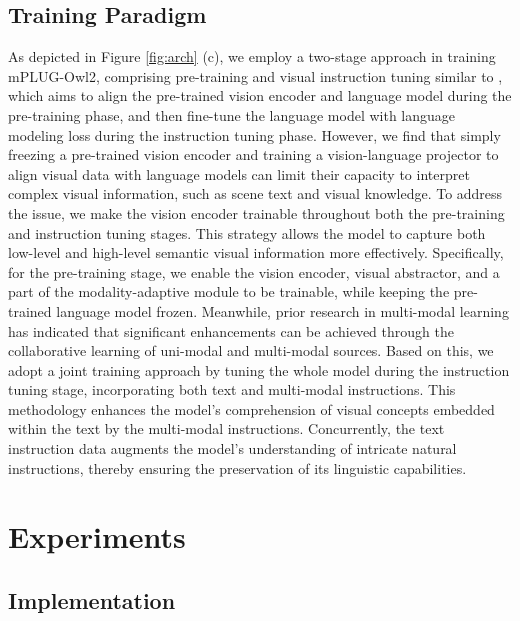 \documentclass[10pt,twocolumn,letterpaper]{article}
\newcommand{\modelname}{mPLUG-Owl2\xspace}
\begin{document}
%
 
\subsection{Training Paradigm}\label{sec:training}
As depicted in Figure \ref{fig:arch} (c), we employ a two-stage approach in training \modelname, comprising pre-training and visual instruction tuning similar to \cite{Liu2023Llava, ye2023mplugowl}, which aims to align the pre-trained vision encoder and language model during the pre-training phase, and then fine-tune the language model with language modeling loss during the instruction tuning phase. However, we find that simply freezing a pre-trained vision encoder and training a vision-language projector to align visual data with language models can limit their capacity to interpret complex visual information, such as scene text and visual knowledge. To address the issue, we make the vision encoder trainable throughout both the pre-training and instruction tuning stages. This strategy allows the model to capture both low-level and high-level semantic visual information more effectively. Specifically, for the pre-training stage, we enable the vision encoder, visual abstractor, and a part of the modality-adaptive module to be trainable, while keeping the pre-trained language model frozen. 
Meanwhile, prior research in multi-modal learning \cite{xu2023mplug2} has indicated that significant enhancements can be achieved through the collaborative learning of uni-modal and multi-modal sources. Based on this, we adopt a joint training approach by tuning the whole model during the instruction tuning stage, incorporating both text and multi-modal instructions. This methodology enhances the model's comprehension of visual concepts embedded within the text by the multi-modal instructions. Concurrently, the text instruction data augments the model's understanding of intricate natural instructions, thereby ensuring the preservation of its linguistic capabilities.


\section{Experiments}
\subsection{Implementation}
\end{document}
